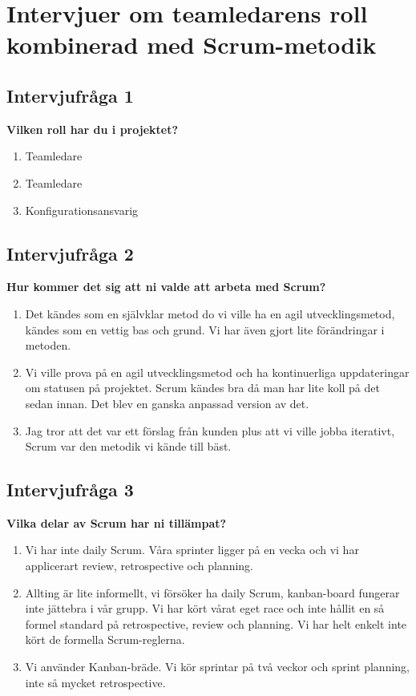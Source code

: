 \chapter{Intervjuer om teamledarens roll kombinerad med Scrum-metodik}\label{appendix:adam}

\section{Intervjufråga 1}
\textbf{Vilken roll har du i projektet?}
\begin{enumerate}
\item Teamledare
\item Teamledare
\item Konfigurationsansvarig
\end{enumerate}

\section{Intervjufråga 2}
\textbf{Hur kommer det sig att ni valde att arbeta med Scrum?}
\begin{enumerate}
\item Det kändes som en självklar metod do vi ville ha en agil utvecklingsmetod, kändes som en vettig bas och grund. Vi har även gjort lite förändringar i metoden.
\item Vi ville prova på en agil utvecklingsmetod och ha kontinuerliga uppdateringar om statusen på projektet. Scrum kändes bra då man har lite koll på det sedan innan. Det blev en ganska anpassad version av det.
\item Jag tror att det var ett förslag från kunden plus att vi ville jobba iterativt, Scrum var den metodik vi kände till bäst.
\end{enumerate}

\section{Intervjufråga 3}
\textbf{Vilka delar av Scrum har ni tillämpat?}
\begin{enumerate}
\item Vi har inte daily Scrum. Våra sprinter ligger på en vecka och vi har applicerart review, retrospective och planning.
\item Allting är lite informellt, vi försöker ha daily Scrum, kanban-board fungerar inte jättebra i vår grupp. Vi har kört vårat eget race och inte hållit en så formel standard på retrospective, review och planning. Vi har helt enkelt inte kört de formella Scrum-reglerna.
\item Vi använder Kanban-bräde. Vi kör sprintar på två veckor och sprint planning, inte så mycket retrospective.
\end{enumerate}

